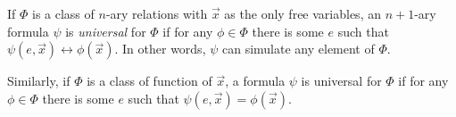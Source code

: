\documentclass[12pt]{article}
\begin{document}
If $\Phi$ is a class of $n$-ary relations with $\vec{x}$ as the only free variables, an $n+1$-ary formula $\psi$ is \emph{universal} for $\Phi$ if for any $\phi\in\Phi$ there is some $e$ such that $\psi(e,\vec{x})\leftrightarrow\phi(\vec{x})$. In other words, $\psi$ can simulate any element of $\Phi$.

Similarly, if $\Phi$ is a class of function of $\vec{x}$, a formula $\psi$ is universal for $\Phi$ if for any $\phi\in\Phi$ there is some $e$ such that $\psi(e,\vec{x})=\phi(\vec{x})$.
\end{document}
